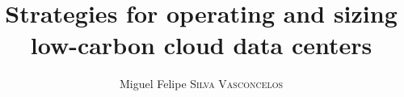\documentclass[%
	paper=A4,              %
	twoside=true,          %
	openright,             %
	parskip=half,          %
	chapterprefix=true,    %
	11pt,                  %
	headings=normal,       %
	bibliography=totoc,    %
	listof=totoc,          %
	titlepage=on,          %
	chapterprefix=false,   %
	appendixprefix=false,  %
	draft=false,           %
]{scrreprt}
\title{Strategies for operating and sizing low-carbon cloud data centers}
\author{Miguel Felipe \textsc{Silva Vasconcelos}}
\begin{document}

\pagestyle{empty}  %


\cleardoublepage





\newcommand{\tdmv}[1]{\todo[noinline, backgroundcolor=orange!20, bordercolor=orange, textcolor=purple]{{Miguel: #1}}{}}
\newcommand{\tdfd}[1]{\todo[noinline, backgroundcolor=blue!20, bordercolor=blue, textcolor=blue]{Fanny: #1}}
\newcommand{\tddc}[1]{\todo[noinline,backgroundcolor=teal!20, bordercolor=teal, textcolor=teal]{{Daniel: #1}}{}}




\doublespacing

\setcounter{secnumdepth}{5}

%

%

\pagestyle{plain}  %

%


\cleardoublepage

\listoffigures
\cleardoublepage

\listoftables
\cleardoublepage

\setcounter{tocdepth}{3}  %
\tableofcontents
\cleardoublepage






\cleardoublepage


\renewcommand*{\thepage}{A\arabic{page}}  %
\end{document}
